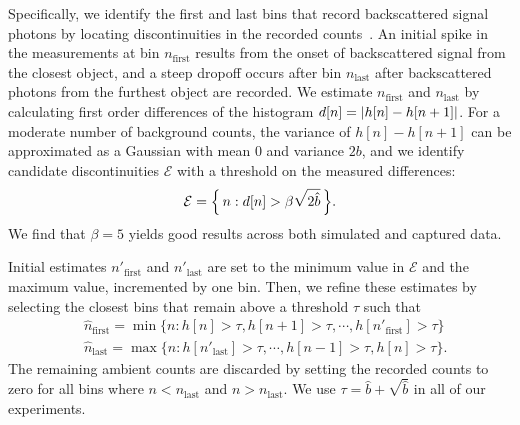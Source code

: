 Specifically, we identify the first and last bins that record backscattered signal
photons by locating discontinuities in the recorded counts~\cite{Xin2019}. An initial spike in
the measurements at bin $n_\text{first}$ results from the onset of backscattered signal from the closest
object, and a steep dropoff occurs after bin $n_\text{last}$ after backscattered photons from the
furthest object are recorded. 
We estimate $n_\text{first}$ and $n_\text{last}$ by calculating  
first order differences of the histogram $d[n] = \lvert h[n] - h[n+1]\rvert$. 
For a moderate number of background counts, the variance of $h[n] - h[n+1]$ can be approximated  
as a Gaussian with mean $0$ and variance $2b$, and we identify candidate discontinuities
$\mathcal{E}$ with a threshold on the measured differences:
%
\begin{equation}
  \mathcal{E} = \mset{n}{d[n] > \beta\sqrt{2\hat b}}.
  \label{eq:edge_set}
\end{equation}
We find that $\beta = 5$ yields good results across both simulated and captured
data.

Initial estimates $n'_\text{first}$ and $n'_\text{last}$ are set to the minimum
value in $\mathcal{E}$ and the maximum value, incremented by one bin. 
Then, we refine these estimates by selecting the closest bins that remain above
a threshold $\tau$ such that
\begin{equation}
    \begin{split}
        &\hat n_\text{first}=\min\{n : h[n] > \tau, h[n+1] > \tau,
            \cdots, h[n'_\text{first}] > \tau\}\\
        &\hat n_\text{last}=\max\{n : h[n'_\text{last}] > \tau,
    \cdots, h[n-1] > \tau, h[n] > \tau\}.
    \end{split}
\end{equation}
The remaining ambient counts are discarded by setting the recorded counts to
zero for all bins where $n < n_\text{last}$ and $n > n_\text{last}$. We use 
$\tau = \hat b + \sqrt{\hat b}$ in all of our experiments.


